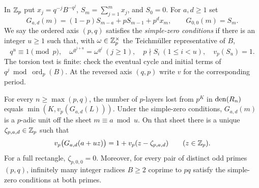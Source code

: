 \documentclass[11pt]{article}
\begin{document}
In $\mathbb Z_p$ put $x_j=q^{-j}B^{-q^j}$, $S_m=\sum_{j=1}^m x_j$, and $S_0=0$. For $a,d\ge1$ set
\[
 G_{a,d}(m)=(1-p)S_{m-a}+pS_{m-1}+p^d x_m ,
 \qquad G_{0,0}(m)=S_m .
\]
We say the ordered axis $(p,q)$ satisfies the \emph{simple-zero conditions} if there is an integer $u\ge1$ such that, with $\omega\in\mathbb Z_p^\times$ the Teichm\"uller representative of $B$,
\[
 q^u\equiv1\pmod p,\quad
 \omega^{q^{j+u}}=\omega^{q^j}\ (j\ge1),\quad
 p\nmid S_i\ (1\le i<u),\quad v_p(S_u)=1 .
\]
The torsion test is finite: check the eventual cycle and initial terms of $q^j\bmod\operatorname{ord}_p(B)$. At the reversed axis $(q,p)$ write $v$ for the corresponding period.

\begin{proposition}\label{th:local}
For every $n\ge\max(p,q)$, the number of $p$-layers lost from $p^K$ in $\operatorname{den}(R_n)$ equals $\min(K,v_p(G_{a,d}(L)))$. Under the simple-zero conditions, $G_{a,d}(m)$ is a $p$-adic unit off the sheet $m\equiv a\bmod u$. On that sheet there is a unique $\zeta_{p,a,d}\in\mathbb Z_p$ such that
\[
 v_p\bigl(G_{a,d}(a+uz)\bigr)=1+v_p(z-\zeta_{p,a,d}) \qquad (z\in\mathbb Z_p).
\]
For a full rectangle, $\zeta_{p,0,0}=0$. Moreover, for every pair of distinct odd primes $(p,q)$, infinitely many integer radices $B\ge2$ coprime to $pq$ satisfy the simple-zero conditions at both primes.
\end{proposition}
\end{document}
